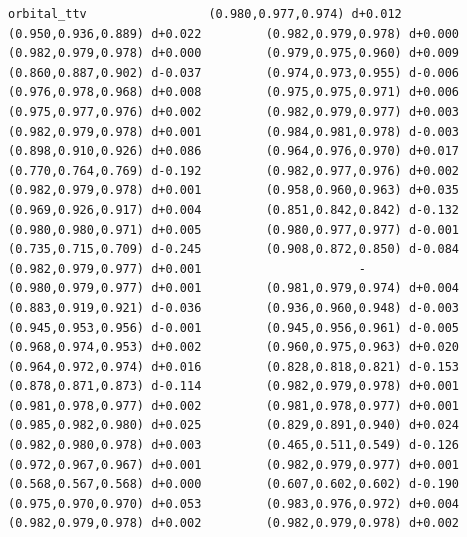 \documentclass[11pt, letterpaper, openany]{book}
\begin{document}
\begin{empiricalbox}
\begin{lstlisting}[style=terminal]
orbital_ttv                 (0.980,0.977,0.974) d+0.012         (0.950,0.936,0.889) d+0.022         (0.982,0.979,0.978) d+0.000         (0.982,0.979,0.978) d+0.000         (0.979,0.975,0.960) d+0.009         (0.860,0.887,0.902) d-0.037         (0.974,0.973,0.955) d-0.006         (0.976,0.978,0.968) d+0.008         (0.975,0.975,0.971) d+0.006         (0.975,0.977,0.976) d+0.002         (0.982,0.979,0.977) d+0.003         (0.982,0.979,0.978) d+0.001         (0.984,0.981,0.978) d-0.003         (0.898,0.910,0.926) d+0.086         (0.964,0.976,0.970) d+0.017         (0.770,0.764,0.769) d-0.192         (0.982,0.977,0.976) d+0.002         (0.982,0.979,0.978) d+0.001         (0.958,0.960,0.963) d+0.035         (0.969,0.926,0.917) d+0.004         (0.851,0.842,0.842) d-0.132         (0.980,0.980,0.971) d+0.005         (0.980,0.977,0.977) d-0.001         (0.735,0.715,0.709) d-0.245         (0.908,0.872,0.850) d-0.084         (0.982,0.979,0.977) d+0.001                      -                      (0.980,0.979,0.977) d+0.001         (0.981,0.979,0.974) d+0.004         (0.883,0.919,0.921) d-0.036         (0.936,0.960,0.948) d-0.003         (0.945,0.953,0.956) d-0.001         (0.945,0.956,0.961) d-0.005         (0.968,0.974,0.953) d+0.002         (0.960,0.975,0.963) d+0.020         (0.964,0.972,0.974) d+0.016         (0.828,0.818,0.821) d-0.153         (0.878,0.871,0.873) d-0.114         (0.982,0.979,0.978) d+0.001         (0.981,0.978,0.977) d+0.002         (0.981,0.978,0.977) d+0.001         (0.985,0.982,0.980) d+0.025         (0.829,0.891,0.940) d+0.024         (0.982,0.980,0.978) d+0.003         (0.465,0.511,0.549) d-0.126         (0.972,0.967,0.967) d+0.001         (0.982,0.979,0.977) d+0.001         (0.568,0.567,0.568) d+0.000         (0.607,0.602,0.602) d-0.190         (0.975,0.970,0.970) d+0.053         (0.983,0.976,0.972) d+0.004         (0.982,0.979,0.978) d+0.002         (0.982,0.979,0.978) d+0.002     

\end{lstlisting}
\end{empiricalbox}
\end{document}

